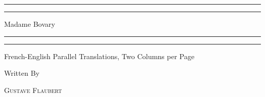 \documentclass[a5paper]{book}
\begin{document}
\begin{titlepage} %

	\centering %
	
	\scshape %
	
	\vspace*{\baselineskip} %
	
	
	\rule{\textwidth}{1.6pt}\vspace*{-\baselineskip}\vspace*{2pt} %
	\rule{\textwidth}{0.4pt} %
	
	\vspace{0.75\baselineskip} %
	
	{\LARGE Madame Bovary\\} %
	
	\vspace{0.75\baselineskip} %
	
	\rule{\textwidth}{0.4pt}\vspace*{-\baselineskip}\vspace{3.2pt} %
	\rule{\textwidth}{1.6pt} %
	
	\vspace{2\baselineskip} %
	
	
	French-English Parallel Translations, Two Columns per Page %
	
	\vspace*{3\baselineskip} %
	
	
	Written By
	
	\vspace{0.5\baselineskip} %
	
	{\scshape\Large Gustave Flaubert \\} %
	

\end{titlepage}
\end{document}
